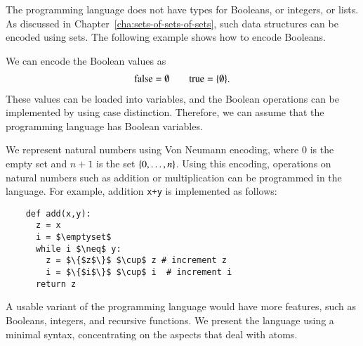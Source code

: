 The programming language does not have types for Booleans, or integers, or lists.  As discussed in Chapter~\ref{cha:sets-of-sets-of-sets},  such  data structures can be encoded using sets.  The following example shows how to encode Booleans.

\begin{myexample}
	\label{ex:Booleans} We can encode the Boolean values as 
	\begin{align*}
	\text{false} = \emptyset \qquad \text{true} = \{\emptyset\}.
	\end{align*}
	These values can be loaded into variables,  
	and the Boolean operations can be implemented by using case distinction. Therefore, we can assume that the programming language has Boolean variables. 
\end{myexample}

\begin{myexample}\label{ex:von-neumann} We represent natural numbers using Von Neumann encoding,  where $0$ is the empty set and $n+1$ is the set $\{0,\ldots,n\}$. Using this encoding, 
	operations on natural numbers such as addition or multiplication can be programmed in the language.  For example, addition \texttt{x+y} is implemented as follows:
	\begin{lstlisting}
	def add(x,y):
	  z = x
	  i = $\emptyset$
	  while i $\neq$ y:
		z = $\{$z$\}$ $\cup$ z # increment z
		i = $\{$i$\}$ $\cup$ i  # increment i
	  return z
	\end{lstlisting}		
\end{myexample}

A usable variant of the programming language would have more features, such as Booleans, integers, and recursive functions. We present the language using a minimal syntax, concentrating on the aspects  that deal with atoms.


